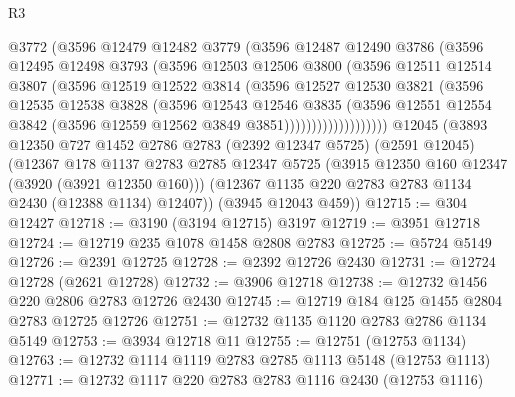\begin{lexlean}{R3}
\begin{coremodule}
                    @3772
                    (@3596
                      @12479
                      @12482
                      @3779
                      (@3596
                        @12487
                        @12490
                        @3786
                        (@3596
                          @12495
                          @12498
                          @3793
                          (@3596
                            @12503
                            @12506
                            @3800
                            (@3596
                              @12511
                              @12514
                              @3807
                              (@3596
                                @12519
                                @12522
                                @3814
                                (@3596
                                  @12527
                                  @12530
                                  @3821
                                  (@3596
                                    @12535
                                    @12538
                                    @3828
                                    (@3596
                                      @12543
                                      @12546
                                      @3835
                                      (@3596
                                        @12551
                                        @12554
                                        @3842
                                        (@3596 @12559 @12562 @3849 @3851)))))))))))))))))))
    @12045
    (@3893
      @12350
      @727
      @1452
      @2786
      @2783
      (@2392 @12347 @5725)
      (@2591 @12045)
      (@12367
        @178
        @1137
        @2783
        @2785
        @12347
        @5725
        (@3915 @12350 @160 @12347 (@3920 (@3921 @12350 @160)))
        (@12367 @1135 @220 @2783 @2783 @1134 @2430 (@12388 @1134) @12407))
      (@3945 @12043 @459))
@12715 := @304 @12427
@12718 := @3190 (@3194 @12715) @3197
@12719 := @3951 @12718
@12724 := @12719 @235 @1078 @1458 @2808 @2783
@12725 := @5724 @5149
@12726 := @2391 @12725
@12728 := @2392 @12726 @2430
@12731 := @12724 @12728 (@2621 @12728)
@12732 := @3906 @12718
@12738 := @12732 @1456 @220 @2806 @2783 @12726 @2430
@12745 := @12719 @184 @125 @1455 @2804 @2783 @12725 @12726
@12751 := @12732 @1135 @1120 @2783 @2786 @1134 @5149
@12753 := @3934 @12718 @11
@12755 := @12751 (@12753 @1134)
@12763 := @12732 @1114 @1119 @2783 @2785 @1113 @5148 (@12753 @1113)
@12771 := @12732 @1117 @220 @2783 @2783 @1116 @2430 (@12753 @1116)

\end{coremodule}
\end{lexlean}
